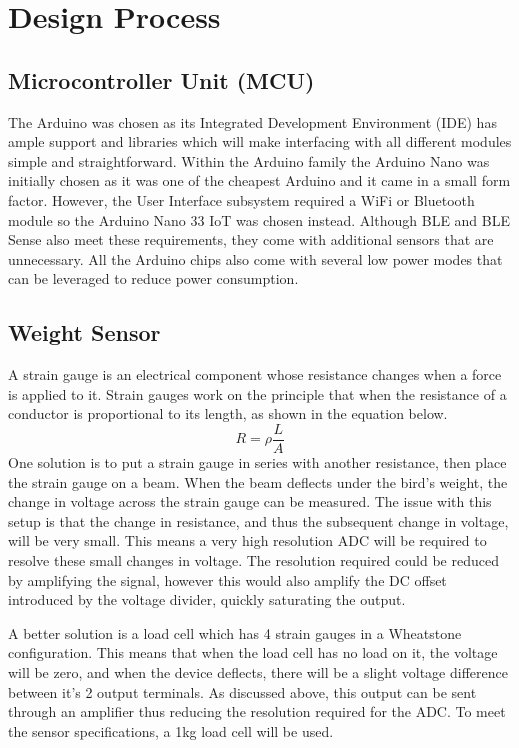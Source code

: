 \documentclass[class=report,11pt,crop=false]{standalone}
\begin{document}
	\section{Design Process}
	
	\subsection{Microcontroller Unit (MCU)}
	The Arduino was chosen as its Integrated Development Environment (IDE) has ample support and libraries which will make interfacing with all different modules simple and straightforward. Within the Arduino family the Arduino Nano was initially chosen as it was one of the cheapest Arduino and it came in a small form factor. However, the User Interface subsystem required a WiFi or Bluetooth module so the Arduino Nano 33 IoT was chosen instead. Although BLE and BLE Sense also meet these requirements, they come with additional sensors that are unnecessary. All the Arduino chips also come with several low power modes that can be leveraged to reduce power consumption.
	
	\subsection{Weight Sensor}
	A strain gauge is an electrical component whose resistance changes when a force is applied to it. Strain gauges work on the principle that when the resistance of a conductor is proportional to its length, as shown in the equation below. 
	\[R = \rho \frac{L}{A}\]
	One solution is to put a strain gauge in series with another resistance, then place the strain gauge on a beam. When the beam deflects under the bird’s weight, the change in voltage across the strain gauge can be measured. The issue with this setup is that the change in resistance, and thus the subsequent change in voltage, will be very small. This means a very high resolution ADC will be required to resolve these small changes in voltage. The resolution required could be reduced by amplifying the signal, however this would also amplify the DC offset introduced by the voltage divider, quickly saturating the output.
	
	A better solution is a load cell which has 4 strain gauges in a Wheatstone configuration. This means that when the load cell has no load on it, the voltage will be zero, and when the device deflects, there will be a slight voltage difference between it’s 2 output terminals. As discussed above, this output can be sent through an amplifier thus reducing the resolution required for the ADC. To meet the sensor specifications, a 1kg load cell will be used. 
	
\end{document}
